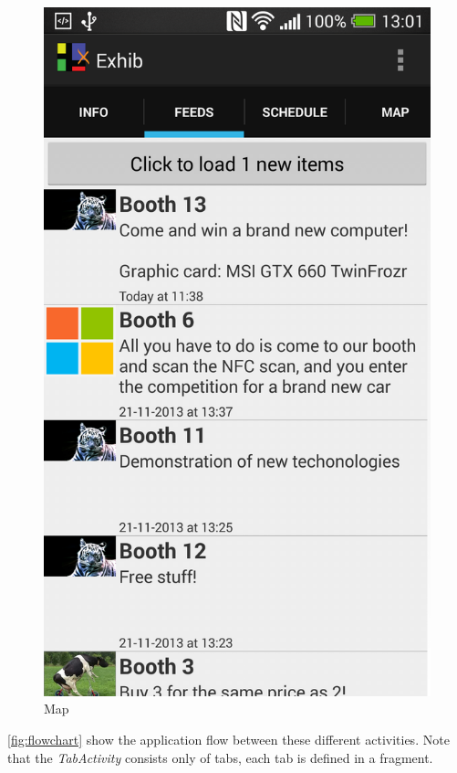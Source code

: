 \begin{figure}[H]
\begin{minipage}[b]{0.5\columnwidth}
\includegraphics[width=\columnwidth]{img/finaldesign/feedsnewitem.png}
\caption{Map}
\label{fig:feedsnewitem}
\end{minipage}
\end{figure}

\autoref{fig:flowchart} show the application flow between these different activities. Note that the \textit{TabActivity} consists only of tabs, each tab is defined in a fragment.

